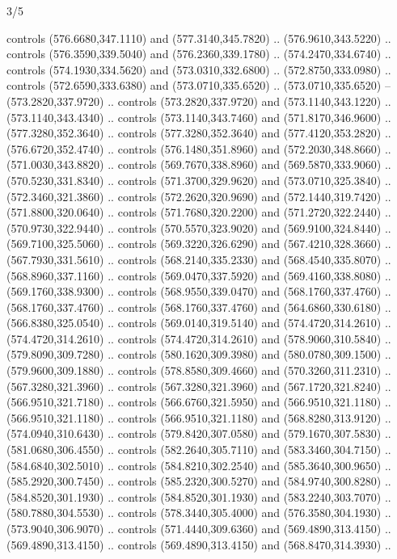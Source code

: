 \begin{flagdescription}{3/5}
\begin{scope}[xshift=0.5\flaglength,yshift=0.5\flagwidth,scale=\flagwidth/602.3]
\begin{scope}[y=0.8pt, x=0.8pt, yscale=-1, shift={(-600,-330)}]
  controls (576.6680,347.1110) and (577.3140,345.7820) .. (576.9610,343.5220) ..
  controls (576.3590,339.5040) and (576.2360,339.1780) .. (574.2470,334.6740) ..
  controls (574.1930,334.5620) and (573.0310,332.6800) .. (572.8750,333.0980) ..
  controls (572.6590,333.6380) and (573.0710,335.6520) .. (573.0710,335.6520) --
  (573.2820,337.9720) .. controls (573.2820,337.9720) and (573.1140,343.1220) ..
  (573.1140,343.4340) .. controls (573.1140,343.7460) and (571.8170,346.9600) ..
  (577.3280,352.3640) .. controls (577.3280,352.3640) and (577.4120,353.2820) ..
  (576.6720,352.4740) .. controls (576.1480,351.8960) and (572.2030,348.8660) ..
  (571.0030,343.8820) .. controls (569.7670,338.8960) and (569.5870,333.9060) ..
  (570.5230,331.8340) .. controls (571.3700,329.9620) and (573.0710,325.3840) ..
  (572.3460,321.3860) .. controls (572.2620,320.9690) and (572.1440,319.7420) ..
  (571.8800,320.0640) .. controls (571.7680,320.2200) and (571.2720,322.2440) ..
  (570.9730,322.9440) .. controls (570.5570,323.9020) and (569.9100,324.8440) ..
  (569.7100,325.5060) .. controls (569.3220,326.6290) and (567.4210,328.3660) ..
  (567.7930,331.5610) .. controls (568.2140,335.2330) and (568.4540,335.8070) ..
  (568.8960,337.1160) .. controls (569.0470,337.5920) and (569.4160,338.8080) ..
  (569.1760,338.9300) .. controls (568.9550,339.0470) and (568.1760,337.4760) ..
  (568.1760,337.4760) .. controls (568.1760,337.4760) and (564.6860,330.6180) ..
  (566.8380,325.0540) .. controls (569.0140,319.5140) and (574.4720,314.2610) ..
  (574.4720,314.2610) .. controls (574.4720,314.2610) and (578.9060,310.5840) ..
  (579.8090,309.7280) .. controls (580.1620,309.3980) and (580.0780,309.1500) ..
  (579.9600,309.1880) .. controls (578.8580,309.4660) and (570.3260,311.2310) ..
  (567.3280,321.3960) .. controls (567.3280,321.3960) and (567.1720,321.8240) ..
  (566.9510,321.7180) .. controls (566.6760,321.5950) and (566.9510,321.1180) ..
  (566.9510,321.1180) .. controls (566.9510,321.1180) and (568.8280,313.9120) ..
  (574.0940,310.6430) .. controls (579.8420,307.0580) and (579.1670,307.5830) ..
  (581.0680,306.4550) .. controls (582.2640,305.7110) and (583.3460,304.7150) ..
  (584.6840,302.5010) .. controls (584.8210,302.2540) and (585.3640,300.9650) ..
  (585.2920,300.7450) .. controls (585.2320,300.5270) and (584.9740,300.8280) ..
  (584.8520,301.1930) .. controls (584.8520,301.1930) and (583.2240,303.7070) ..
  (580.7880,304.5530) .. controls (578.3440,305.4000) and (576.3580,304.1930) ..
  (573.9040,306.9070) .. controls (571.4440,309.6360) and (569.4890,313.4150) ..
  (569.4890,313.4150) .. controls (569.4890,313.4150) and (568.8470,314.3930) ..

\end{scope}
\end{scope}
\end{flagdescription}
